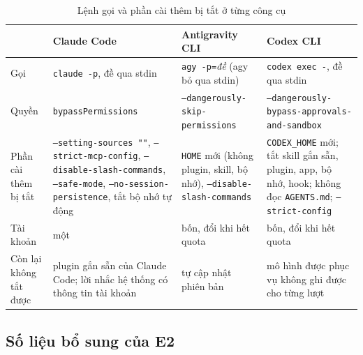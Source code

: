 \begin{table}[H]
\centering\small
\caption{Lệnh gọi và phần cài thêm bị tắt ở từng công cụ}\label{tab:conditions}
\footnotesize
\begin{tabularx}{\linewidth}{@{}lXXX@{}}
\toprule
& Claude Code & Antigravity CLI & Codex CLI \\
\midrule
Gọi & \texttt{claude -p}, đề qua stdin & \texttt{agy -p=}\textit{đề} (agy bỏ qua stdin) & \texttt{codex exec -}, đề
qua stdin \\
Quyền & \texttt{bypassPermissions} & \texttt{--dangerously-\allowbreak skip-\allowbreak permissions} &
\texttt{--dangerously-\allowbreak bypass-\allowbreak approvals-\allowbreak and-\allowbreak sandbox} \\
Phần cài thêm bị tắt & \texttt{--setting-\allowbreak sources ""}, \texttt{--strict-\allowbreak mcp-\allowbreak config},
\texttt{--disable-\allowbreak slash-\allowbreak commands}, \texttt{--safe-mode}, \texttt{--no-\allowbreak session-\allowbreak persistence}, tắt bộ nhớ tự
động & \texttt{HOME} mới (không plugin, skill, bộ nhớ), \texttt{--disable-\allowbreak slash-\allowbreak commands} &
\texttt{CODEX\_HOME} mới; tắt skill gắn sẵn, plugin, app, bộ nhớ, hook; không đọc \texttt{AGENTS.md};
\texttt{--strict-config} \\
Tài khoản & một & bốn, đổi khi hết quota & bốn, đổi khi hết quota \\
Còn lại không tắt được & plugin gắn sẵn của Claude Code; lời nhắc hệ thống có thông tin tài khoản & tự
cập nhật phiên bản & mô hình được phục vụ không ghi được cho từng lượt \\
\bottomrule
\end{tabularx}
\end{table}

\subsection{Số liệu bổ sung của E2}\label{app:e2-coverage}

\begin{table}[H]
\centering\small
\caption{E2, thiết kế $2\times 2$: trung bình gộp các nhóm có dữ liệu (tầng vừa, tầng lớn chỉ có ba nhóm Claude) và tương tác
(đặc tả $-$ vibe khi đề sơ sài) $-$ (đặc tả $-$ vibe khi đề chi tiết). $^\dagger$Không đo độ đúng khi đề
sơ sài, vì hidden test gọi tên mà đề không nêu.}
\label{tab:e2-x2}

\end{table}
